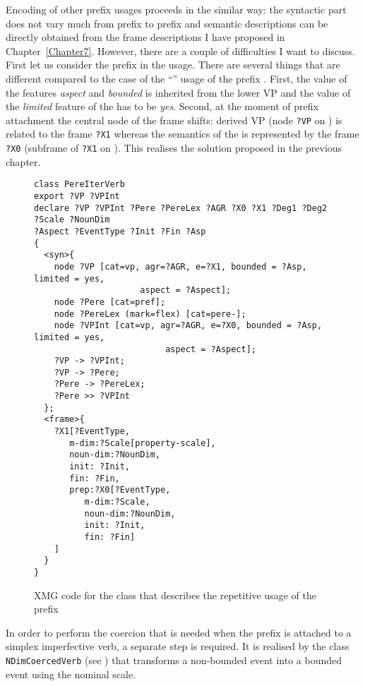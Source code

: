 Encoding of other prefix usages proceeds in the similar way: the syntactic part does not vary much from prefix to prefix and semantic descriptions can be directly obtained from the frame descriptions I have proposed in Chapter~\ref{Chapter7}. However, there are a couple of difficulties I want to discuss. First let us consider the prefix  in the  usage. There are several things that are different compared to the case of the ``'' usage of the prefix . First, the value of the features \textit{aspect} and \textit{bounded} is inherited from the  lower VP and the value of the \textit{limited} feature of the  has to be \textit{yes}. Second, at the moment of prefix attachment the central node of the frame shifts: derived VP (node \texttt{?VP} on ) is related to the frame \texttt{?X1} whereas the semantics of the  is represented by the frame \texttt{?X0} (subframe of \texttt{?X1} on ). This realises the solution proposed in the previous chapter. 

\begin{figure}
\begin{lstlisting}[style=xmg]
class PereIterVerb
export ?VP ?VPInt 
declare ?VP ?VPInt ?Pere ?PereLex ?AGR ?X0 ?X1 ?Deg1 ?Deg2 ?Scale ?NounDim
?Aspect ?EventType ?Init ?Fin ?Asp
{
  <syn>{
    node ?VP [cat=vp, agr=?AGR, e=?X1, bounded = ?Asp, limited = yes, 
    				 aspect = ?Aspect];
    node ?Pere [cat=pref];
    node ?PereLex (mark=flex) [cat=pere-];
    node ?VPInt [cat=vp, agr=?AGR, e=?X0, bounded = ?Asp, limited = yes, 
    					  aspect = ?Aspect];
    ?VP -> ?VPInt;
    ?VP -> ?Pere;
    ?Pere -> ?PereLex;
    ?Pere >> ?VPInt
  };
  <frame>{
    ?X1[?EventType,
       m-dim:?Scale[property-scale],
       noun-dim:?NounDim,
       init: ?Init,
       fin: ?Fin,
       prep:?X0[?EventType,
          m-dim:?Scale,
          noun-dim:?NounDim,
          init: ?Init,
          fin: ?Fin]
    ]
  }
}
\end{lstlisting}
\caption{XMG code for the class that describes the repetitive usage of the prefix \label{code:pere}}
\end{figure}

In order to perform the coercion that is needed when the prefix  is attached to a simplex imperfective verb, a separate step is required. It is realised by the class \texttt{NDimCoercedVerb} (see ) that transforms a non-bounded event into a bounded event using the nominal scale.

